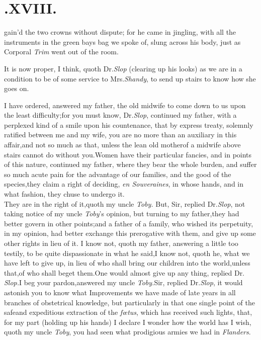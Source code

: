 \documentclass{article}
\begin{document}
\bigskip

\section{.\enspace  XVIII.}

 gain’d the two crowns without
dispute; for he came in jingling, with all the instruments in
the green bays bag we spoke of, slung across his body, just as
Corporal \textit{Trim} went out of the room.

It is now proper, I think, quoth Dr.\@ \textit{Slop} (clearing up
his looks) as we are in a condition to be of some service to
Mrs.\@ \textit{Shandy}, to send up stairs to know\break 
how she goes on.

I have ordered, answered my father, 
the old midwife to come down to us\break
upon the least difficulty;\tsh for you\break
must know, Dr.\@ \textit{Slop}, continued my father, with a perplexed kind of a
smile upon his countenance, that by express treaty, solemnly
ratified between me and my wife, you are no more than an
auxi\-liary in this affair,\tsh and not so much as that,\tsh
unless the lean old mother\break of a midwife above stairs cannot do
without you.\tsh Women have their particular fancies, and in
points of this nature, continued my father, where they bear the
whole burden, and suffer so much acute pain for the advantage of
our families, and the good of the species,\tsk they claim a
right of deciding, \textit{en Souveraines}, in whose hands, and
in
what fashion, they chuse to undergo it.\\
\newpage
They are in the right of it,\tsh quoth\break
my uncle \textit{Toby.} But, Sir, replied Dr.\@ \textit{Slop}, not taking notice of
my uncle \textit{Toby}’s opinion, but turning to my
father,\tsk they had better govern in other
points;\tsh and a father of a family, who wished its
perpetuity, in my opinion, had better exchange this prerogative
with them, and give up some other rights in lieu of
it.\tsh\break
I know not, quoth my father, answering a little too testily, to
be quite dispassionate in what he said,\tsk I know not, quoth
he, what we have left to give up, in lieu of who shall bring our
children into the world,\tsk unless that,\tsk of who shall beget
them.\tsh One would almost give up any thing, replied Dr.\@
\textit{Slop.}\tsk I beg your pardon,\tsh answered my uncle
\textit{Toby.}\break\tsk Sir, replied Dr.\@ \textit{Slop}, it
would astonish you to know what Improvements we have made of
late years in all branches
of obstetrical knowledge, but partic\-u\-larly in that
one single point of the safe\break and expeditious extraction of the
\textit{fœtus},\break
\tsh which has received such lights, that, 
for my part (holding up his hands) I 
declare I wonder how the world has\tsh\break
I wish, quoth my uncle \textit{Toby}, you had
seen what prodigious armies we had in \textit{Flanders}.
\end{document}
